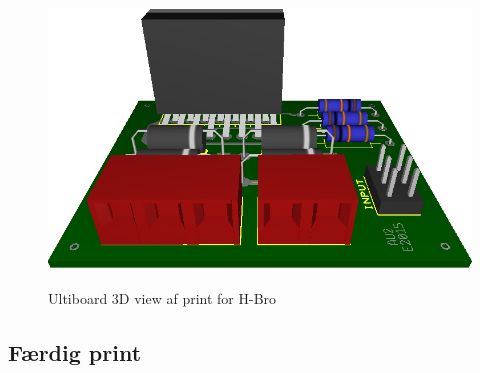 \begin{figure}[h]
	\centering
	\includegraphics[width=\textwidth* 7/10]{../fig/billeder/Ultiboard_Print_H_Bro}
	\label{fig:Ultiboard_Print_H_Bro}
	\caption{Ultiboard 3D view af print for H-Bro}
\end{figure}

\clearpage
\subsection*{Færdig print}





